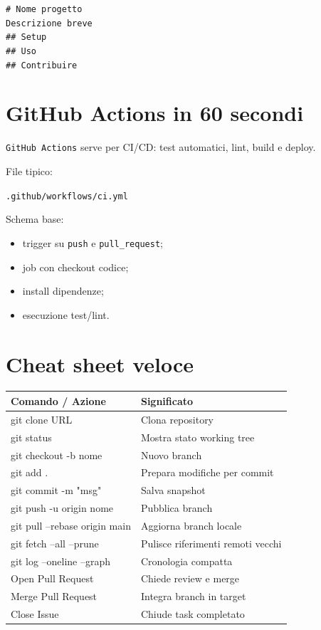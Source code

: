 \documentclass[a4paper,11pt]{article}
\begin{document}
\begin{codebox}
\texttt{\# Nome progetto} \\
\texttt{Descrizione breve} \\
\texttt{\#\# Setup} \\
\texttt{\#\# Uso} \\
\texttt{\#\# Contribuire}
\end{codebox}

\section{GitHub Actions in 60 secondi}
\texttt{GitHub Actions} serve per CI/CD: test automatici, lint, build e deploy.

File tipico:
\begin{codebox}
\texttt{.github/workflows/ci.yml}
\end{codebox}

Schema base:
\begin{itemize}[leftmargin=1.2cm]
    \item trigger su \texttt{push} e \texttt{pull\_request};
    \item job con checkout codice;
    \item install dipendenze;
    \item esecuzione test/lint.
\end{itemize}

\section{Cheat sheet veloce}
\begin{center}
\renewcommand{\arraystretch}{1.25}
\begin{tabularx}{\textwidth}{>{\ttfamily}l X}
\toprule
Comando / Azione & Significato \\
\midrule
git clone URL & Clona repository \\
git status & Mostra stato working tree \\
git checkout -b nome & Nuovo branch \\
git add . & Prepara modifiche per commit \\
git commit -m "msg" & Salva snapshot \\
git push -u origin nome & Pubblica branch \\
git pull --rebase origin main & Aggiorna branch locale \\
git fetch --all --prune & Pulisce riferimenti remoti vecchi \\
git log --oneline --graph & Cronologia compatta \\
Open Pull Request & Chiede review e merge \\
Merge Pull Request & Integra branch in target \\
Close Issue & Chiude task completato \\
\bottomrule
\end{tabularx}
\end{center}
\end{document}
